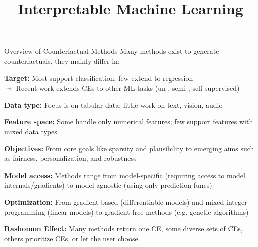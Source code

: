 \documentclass[10pt,compress,t,notes=noshow,xcolor=table]{beamer}
\title{Interpretable Machine Learning}
\begin{document}






\begin{framev}[align=top]{Overview of Counterfactual Methods}
Many methods exist to generate counterfactuals, they mainly differ in:
\begin{itemizeM}
\item<+-> \textbf{Target:} Most support classification; few extend to regression\\
$\leadsto$ Recent work extends CEs to other ML tasks (un-, semi-, self-supervised)
\item<+-> \textbf{Data type:} Focus is on tabular data; little work on text, vision, audio
\item<+-> \textbf{Feature space:} Some handle only numerical features; few support features with mixed data types
\item<+-> \textbf{Objectives:}
From core goals like sparsity and plausibility to emerging aims such as fairness, personalization, and robustness
\item<+-> \textbf{Model access:}
Methods range from model-specific (requiring access to model internals/gradients) to model-agnostic (using only prediction funcs)
\item<+-> \textbf{Optimization:}
From gradient-based (differentiable models) and mixed-integer programming (linear models) to gradient-free methods (e.g. genetic algorithms)
\item<+-> \textbf{Rashomon Effect:} Many methods return one CE, some diverse sets of CEs, others prioritize CEs, or let the user choose
\end{itemizeM}
\end{framev}
\end{document}
